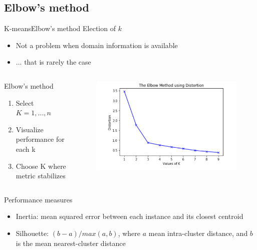 \documentclass[10pt,compress]{beamer} %
\begin{document}
\subsection{Elbow's method}
\begin{frame}{K-means}{Elbow's method}
    Election of $k$
    \begin{itemize}
        \item Not a problem when domain information is available
        \item ... that is rarely the case
    \end{itemize}

    \begin{columns}
        \begin{block}{Elbow's method}
           \begin{enumerate}
            \item Select $K=1, ..., n$
            \item Visualize performance for each k
            \item Choose K where metric stabilizes
           \end{enumerate} 
        \end{block}
			\begin{figure}
		        \includegraphics[width=\textwidth]{figs/elbow.png}
			\end{figure}
    \end{columns}

    Performance measures
    \begin{itemize}       
        \item Inertia: mean squared error between each instance and its closest centroid
        \item Silhouette: $(b-a) / max (a, b)$, where $a$ mean intra-cluster distance, and $b$ is the mean nearest-cluster distance
    \end{itemize}       
\end{frame}
\end{document}
